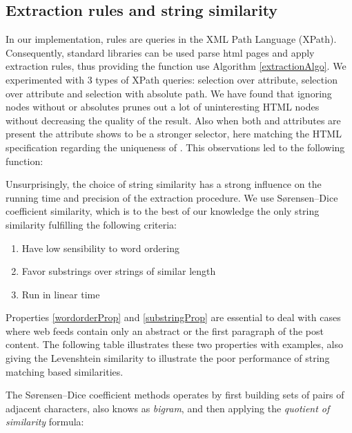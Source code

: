 \clearpage
\subsection{Extraction rules and string similarity}
%
In our implementation, rules are queries in the XML Path Language (XPath). Consequently, standard libraries can be used parse html pages and apply extraction rules, thus providing the  function use Algorithm \ref{extractionAlgo}. We experimented with 3 types of XPath queries: selection over  attribute, selection over  attribute and selection with absolute path. We have found that ignoring nodes without  or  absolutes prunes out a lot of uninteresting HTML nodes without decreasing  the quality of the result. Also when both  and  attributes are present the  attribute shows to be a stronger selector, here matching the HTML specification regarding the uniqueness of . This observations led to the following  function:

\allrulesAlgo

%
Unsurprisingly, the choice of string similarity has a strong influence on the running time and precision of the extraction procedure. We use Sørensen–Dice coefficient similarity\cite{dice1945}, which is to the best of our knowledge the only string similarity fulfilling the following criteria:

\begin{enumerate}
  \item\label{wordorderProp} Have low sensibility to word ordering
  \item\label{substringProp} Favor substrings over strings of similar length
  \item\label{linearProp} Run in linear time
\end{enumerate}

Properties \ref{wordorderProp} and \ref{substringProp} are essential to deal with cases where web feeds contain only an abstract or the first paragraph of the post content. The following table illustrates these two properties with examples, also giving the Levenshtein\cite{levenshtein1966} similarity to illustrate the poor performance of string matching based similarities.

\similarityTable

The Sørensen–Dice coefficient methods operates by first building sets of pairs of adjacent characters, also knows as \emph{bigram}, and then applying the \emph{quotient of similarity} formula:

